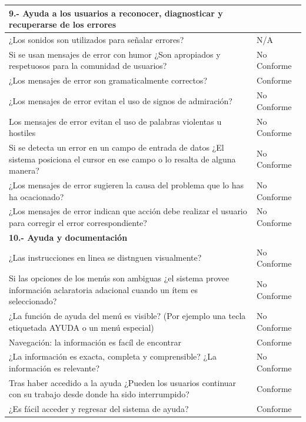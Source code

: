 \documentclass[stu, 12pt, letterpaper, donotrepeattitle, floatsintext, natbib]{apa7}
\begin{document}
\begin{longtable}{|>{\raggedright\arraybackslash}p{10cm}|>{\centering\arraybackslash}p{3cm}|}
    \textbf{9.- Ayuda a los usuarios a reconocer, diagnosticar y recuperarse de los errores} & \\ \hline
    ¿Los sonidos son utilizados para señalar errores? & N/A \\ \hline
    Si se usan mensajes de error con humor ¿Son apropiados y respetuosos para la comunidad de usuarios? & No Conforme\\ \hline
    ¿Los mensajes de error son gramaticalmente correctos? & Conforme \\ \hline
    ¿Los mensajes de error evitan el uso de signos de admiración? & No Conforme\\ \hline
    Los mensajes de error evitan el uso de palabras violentas u hostiles & No Conforme\\ \hline
    Si se detecta un error en un campo de entrada de datos ¿El sistema posiciona el cursor en ese campo o lo resalta de alguna manera? & No Conforme \\ \hline
    ¿Los mensajes de error sugieren la causa del problema que lo has ha ocacionado? & No Conforme \\ \hline
    ¿Los mensajes de error indican que acción debe realizar el usuario para corregir el error correspondiente? & No Conforme \\ \hline

    \textbf{10.- Ayuda y documentación} & \\ \hline
    ¿Las instrucciones en linea se distnguen visualmente?  & No Conforme \\ \hline
    Si las opciones de los menús son ambiguas ¿el sistema provee información aclaratoria adacional cuando un ítem es seleccionado? & No Conforme \\ \hline
    ¿La función de ayuda del menú es visible? (Por ejemplo una tecla etiquetada AYUDA o un menú especial) & No Conforme \\ \hline
    Navegación: la información es facíl de encontrar & Conforme \\ \hline
    ¿La información es exacta, completa y comprensible? ¿La información es relevante? & No Conforme \\ \hline
    Tras haber accedido a la ayuda ¿Pueden los usuarios continuar con su trabajo desde donde ha sido interrumpido? & Conforme \\ \hline
    ¿Es fácil acceder y regresar del sistema de ayuda? & Conforme \\ \hline
\end{longtable}
\end{document}
